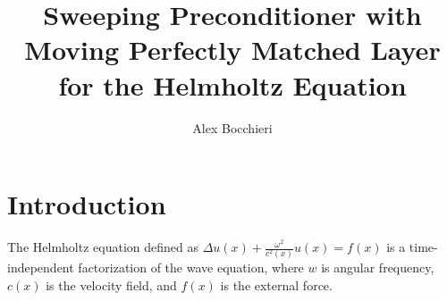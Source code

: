 \documentclass[11pt]{article}
\title{\vspace{-4.0cm}Sweeping Preconditioner with Moving Perfectly Matched Layer for the Helmholtz Equation}
\author{Alex Bocchieri}
\date{}
\begin{document}
\maketitle

\section{Introduction}
The Helmholtz equation defined as $\Delta u(x) + \frac{\omega^2}{c^2(x)}u(x)=f(x)$ is a time-independent factorization of the wave equation, where $w$ is angular frequency, $c(x)$ is the velocity field, and $f(x)$ is the external force.

\cite{engquist2011pml} \cite{engquist2011matrix}






\end{document}
